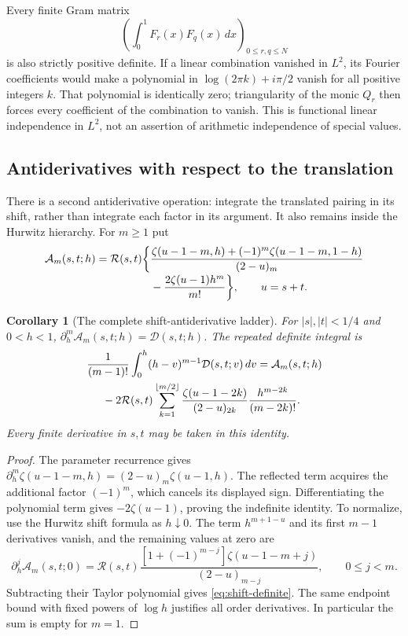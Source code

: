 \documentclass[11pt,a4paper]{article}
\numberwithin{equation}{section}
\newtheorem{corollary}[theorem]{Corollary}
\theoremstyle{definition}
\theoremstyle{remark}
\begin{document}
Every finite Gram matrix
\[ (\int_0^1F_r(x)F_q(x)\,dx)_{0\leq r,q\leq N} \]
is also strictly positive definite. If a linear
combination vanished in $L^2$, its Fourier coefficients would make a
polynomial in $\log(2\pi k)+i\pi/2$ vanish for all positive integers
$k$. That polynomial is identically zero; triangularity of the monic
$Q_r$ then forces every coefficient of the combination to vanish.
This is functional linear independence in $L^2$, not an assertion of
arithmetic independence of special values.

\subsection{Antiderivatives with respect to the translation}

There is a second antiderivative operation: integrate the translated
pairing in its shift, rather than integrate each factor in its argument.
It also remains inside the Hurwitz hierarchy. For $m\geq1$ put
\begin{align}
 \mathcal A_m(s,t;h)=\mathcal R(s,t)\biggl\{
 &\frac{\zeta(u-1-m,h)+(-1)^m\zeta(u-1-m,1-h)}{(2-u)_m}
 \notag\\[-2pt]
 &-\frac{2\zeta(u-1)h^m}{m!}\biggr\},\qquad u=s+t.
 \label{eq:shift-primitive}
\end{align}

\begin{corollary}[The complete shift-antiderivative ladder]
\label{cor:shift-primitive}
For $|s|,|t|<1/4$ and $0<h<1$,
$\partial_h^m\mathcal A_m(s,t;h)=\mathcal D(s,t;h)$.
The repeated definite integral is
\begin{align}
 &\frac1{(m-1)!}\int_0^h(h-v)^{m-1}\mathcal D(s,t;v)\,dv
 =\mathcal A_m(s,t;h)\notag\\
 &\hspace{5mm}-2\mathcal R(s,t)
 \sum_{k=1}^{\lfloor m/2\rfloor}
 \frac{\zeta(u-1-2k)}{(2-u)_{2k}}
 \frac{h^{m-2k}}{(m-2k)!}.
 \label{eq:shift-definite}
\end{align}
Every finite derivative in $s,t$ may be taken in this identity.
\end{corollary}

\begin{proof}
The parameter recurrence gives
$\partial_h^m\zeta(u-1-m,h)=(2-u)_m\zeta(u-1,h)$.
The reflected term acquires the additional factor $(-1)^m$, which
cancels its displayed sign. Differentiating the polynomial term gives
$-2\zeta(u-1)$, proving the indefinite identity.
To normalize, use the Hurwitz shift formula as $h\downarrow0$.
The term $h^{m+1-u}$ and its first $m-1$ derivatives vanish, and
the remaining values at zero are
\[
 \partial_h^j\mathcal A_m(s,t;0)
 =\mathcal R(s,t)
 \frac{[1+(-1)^{m-j}]\zeta(u-1-m+j)}{(2-u)_{m-j}},
 \qquad 0\leq j<m.
\]
Subtracting their Taylor polynomial gives \eqref{eq:shift-definite}.
The same endpoint bound with fixed powers of $\log h$ justifies all
order derivatives. In particular the sum is empty for $m=1$.
\end{proof}
\end{document}
